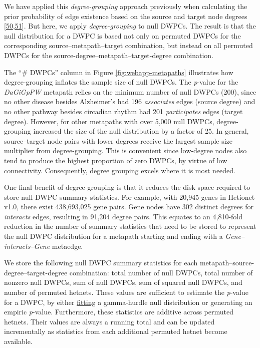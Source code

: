 We have applied this \emph{degree-grouping} approach previously when calculating the prior probability of edge existence based on the source and target node degrees {[}\protect\hyperlink{ref-17QDcGqUi}{50},\protect\hyperlink{ref-19OyKPQ4M}{51}{]}.
But here, we apply \emph{degree-grouping} to null DWPCs.
The result is that the null distribution for a DWPC is based not only on permuted DWPCs for the corresponding source--metapath--target combination,
but instead on all permuted DWPCs for the source-degree--metapath--target-degree combination.

The ``\# DWPCs'' column in Figure \ref{fig:webapp-metapaths} illustrates how degree-grouping inflates the sample size of null DWPCs.
The \emph{p}-value for the \emph{DaGiGpPW} metapath relies on the minimum number of null DWPCs (200),
since no other disease besides Alzheimer's had 196 \emph{associates} edges (source degree) and no other pathway besides circadian rhythm had 201 \emph{participates} edges (target degree).
However, for other metapaths with over 5,000 null DWPCs, degree-grouping increased the size of the null distribution by a factor of 25.
In general, source--target node pairs with lower degrees receive the largest sample size multiplier from degree-grouping.
This is convenient since low-degree nodes also tend to produce the highest proportion of zero DWPCs, by virtue of low connectivity.
Consequently, degree grouping excels where it is most needed.

One final benefit of degree-grouping is that it reduces the disk space required to store null DWPC summary statistics.
For example, with 20,945 genes in Hetionet v1.0, there exist 438,693,025 gene pairs.
Gene nodes have 302 distinct degrees for \emph{interacts} edges, resulting in 91,204 degree pairs.
This equates to an 4,810-fold reduction in the number of summary statistics that need to be stored to represent the null DWPC distribution for a metapath starting and ending with a \emph{Gene--interacts--Gene} metaedge.

We store the following null DWPC summary statistics for each metapath--source-degree--target-degree combination:
total number of null DWPCs,
total number of nonzero null DWPCs,
sum of null DWPCs,
sum of squared null DWPCs,
and number of permuted hetnets.
These values are sufficient to estimate the \emph{p}-value for a DWPC, by either \href{https://github.com/hetio/hetmatpy/blob/bc36aa9859c43a1a5fb22808cd6eb952ef9d497c/hetmatpy/pipeline.py\#L42-L63}{fitting} a gamma-hurdle null distribution or generating an empiric \emph{p}-value.
Furthermore, these statistics are additive across permuted hetnets.
Their values are always a running total and can be updated incrementally as statistics from each additional permuted hetnet become available.

